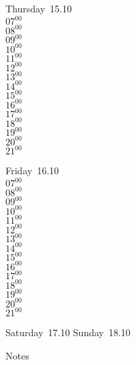 \documentclass[11pt,a4paper]{book}\usepackage[]{graphicx}\usepackage[]{color}
\begin{document}
{{{{{{{{{{{{{{{%
\begin{tcolorbox}
Thursday~15.10\\
{ 
$07^{00}$\\
$08^{00}$\\
$09^{00}$\\
$10^{00}$\\
$11^{00}$\\
$12^{00}$\\
$13^{00}$\\
$14^{00}$\\
$15^{00}$\\
$16^{00}$\\
$17^{00}$\\
$18^{00}$\\
$19^{00}$\\
$20^{00}$\\
$21^{00}$}\\
\end{tcolorbox} 
%
\begin{tcolorbox}
Friday~16.10\\
{ 
$07^{00}$\\
$08^{00}$\\
$09^{00}$\\
$10^{00}$\\
$11^{00}$\\
$12^{00}$\\
$13^{00}$\\
$14^{00}$\\
$15^{00}$\\
$16^{00}$\\
$17^{00}$\\
$18^{00}$\\
$19^{00}$\\
$20^{00}$\\
$21^{00}$}\\
\end{tcolorbox} 
%
\begin{tcolorbox}[height=(\textheight-10mm)/6]
Saturday~17.10
\tcblower
Sunday~18.10
\end{tcolorbox} %
%
\begin{tcolorbox}[height=(\textheight-10mm)/6,sidebyside=false]
Notes
\end{tcolorbox}
\clearpage
\vspace{2 mm}\\
%
}}}}}}}}}}}}}}}
\end{document}
